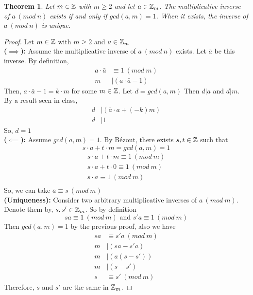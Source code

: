 \documentclass[openany]{report}
\newtheorem{theorem}{Theorem}[section]
\begin{document}
\begin{theorem}\label{theorem8.0.2}
    Let $m \in \mathbb{Z}$ with $m \geq 2$ and let $a \in \mathbb{Z}_m$. The multiplicative inverse of $a \ (mod \ n)$ exists if and only if $gcd(a,m) = 1$. When it exists, the inverse of  $a \ (mod \ n)$ is unique.
\end{theorem}
\begin{proof}
    Let $m\in \mathbb{Z}$ with $m \geq 2$ and $a \in \mathbb{Z}_m$\\[2ex]
    \textbf{($\implies$):} Assume the multiplicative inverse of  $a \ (mod \ n)$ exists. Let $\bar{a}$ be this inverse. By definition,
    \begin{align*}
        a \cdot \bar{a} &\equiv 1 \ (mod \ m)\\
        m &\mid (a \cdot \bar{a} - 1)\tag{def. of modulo}
    \end{align*}
    Then, $a \cdot \bar{a} - 1 = k \cdot m$ for some $m \in \mathbb{Z}$. Let $d = gcd(a,m)$ Then $d|a$ and $d|m$. By a result seen in class, 
    \begin{align*}
        d &\mid (\bar{a} \cdot a + (-k)m)\\
        d &\mid 1
    \end{align*}
    So, $d = 1$\\[2ex]
    \textbf{($\impliedby$):} Assume $gcd(a,m) = 1$. By B\'ezout, there exists $s,t \in \mathbb{Z}$ such that 
    $$s\cdot a + t \cdot m = gcd(a,m) = 1$$
    \begin{align*}
        s \cdot a + t \cdot m \equiv 1 \ (mod \ m)\\
        s \cdot a + t \cdot 0 \equiv 1\ (mod \ m)\\
        s \cdot a \equiv 1 \ (mod \ m)\\
    \end{align*}
    So, we can take $\bar{a} \equiv s \ (mod \ m)$\\[2ex]
    \textbf{(Uniqueness):} Consider two arbitrary multiplicative inverses of $a \ (mod \ m)$. Denote them by, $s, s' \in \mathbb{Z}_m$. So by definition
    $$sa \equiv 1 \ (mod \ m) \text{ and } s'a \equiv 1 \ (mod \ m)$$
    Then $gcd(a,m) = 1$ by the previous proof, also we have 
    \begin{align*}
        sa &\equiv s'a \ (mod \ m)\\
        m &\mid (sa - s'a)\tag{def. of modulo}\\
        m &\mid (a(s-s'))\\
        m &\mid (s-s')\tag{since $gcd(a,m)=1$}\\
        s &\equiv s' \ (mod \ m)\tag{def. of modulo}
    \end{align*}
    Therefore, $s$ and $s'$ are the same in $\mathbb{Z}_m$.
\end{proof}
\end{document}
